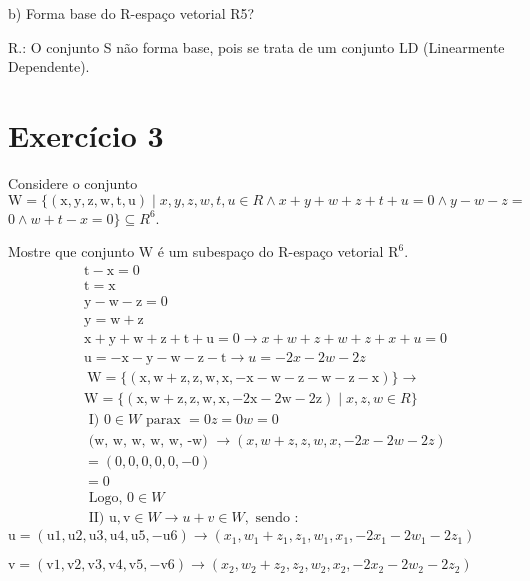 \documentclass[10pt]{article}
\begin{document}
b) Forma base do R-espaço vetorial R5?

R.: O conjunto S não forma base, pois se trata de um conjunto LD (Linearmente Dependente).

\section{Exercício 3}
Considere o conjunto $\mathrm{W}=\{(\mathrm{x}, \mathrm{y}, \mathrm{z}, \mathrm{w}, \mathrm{t}, \mathrm{u}) \mid x, y, z, w, t, u \in R \wedge x+y+w+z+t+u=0 \wedge y-w-z=$ $0 \wedge w+t-x=0\} \subseteq R^{6}$.

Mostre que conjunto $\mathrm{W}$ é um subespaço do R-espaço vetorial $\mathrm{R}^{6}$.
$$
\begin{aligned}
&\mathrm{t}-\mathrm{x}=0 \\
&\mathrm{t}=\mathrm{x} \\
&\mathrm{y}-\mathrm{w}-\mathrm{z}=0 \\
&\mathrm{y}=\mathrm{w}+\mathrm{z} \\
&\mathrm{x}+\mathrm{y}+\mathrm{w}+\mathrm{z}+\mathrm{t}+\mathrm{u}=0 \rightarrow x+w+z+w+z+x+u=0 \\
&\mathrm{u}=-\mathrm{x}-\mathrm{y}-\mathrm{w}-\mathrm{z}-\mathrm{t} \rightarrow u=-2 x-2 w-2 z \\
&\mathrm{~W}=\{(\mathrm{x}, \mathrm{w}+\mathrm{z}, \mathrm{z}, \mathrm{w}, \mathrm{x},-\mathrm{x}-\mathrm{w}-\mathrm{z}-\mathrm{w}-\mathrm{z}-\mathrm{x})\} \rightarrow \\
&\mathrm{W}=\{(\mathrm{x}, \mathrm{w}+\mathrm{z}, \mathrm{z}, \mathrm{w}, \mathrm{x},-2 \mathrm{x}-2 \mathrm{w}-2 \mathrm{z}) \mid x, z, w \in R\} \\
&\text { I) } 0 \in W \text { parax }=0 z=0 w=0 \\
&\text { (w, w, w, w, w, -w) } \rightarrow(x, w+z, z, w, x,-2 x-2 w-2 z) \\
&=(0,0,0,0,0,-0) \\
&=0 \\
&\text { Logo, } 0 \in W \\
&\text { II) } \mathrm{u}, \mathrm{v} \in W \rightarrow u+v \in W, \text { sendo : }
\end{aligned}
$$
$\mathrm{u}=(\mathrm{u} 1, \mathrm{u} 2, \mathrm{u} 3, \mathrm{u} 4, \mathrm{u} 5,-\mathrm{u} 6) \rightarrow\left(x_{1}, w_{1}+z_{1}, z_{1}, w_{1}, x_{1},-2 x_{1}-2 w_{1}-2 z_{1}\right)$

$\mathrm{v}=(\mathrm{v} 1, \mathrm{v} 2, \mathrm{v} 3, \mathrm{v} 4, \mathrm{v} 5,-\mathrm{v} 6) \rightarrow\left(x_{2}, w_{2}+z_{2}, z_{2}, w_{2}, x_{2},-2 x_{2}-2 w_{2}-2 z_{2}\right)$
\end{document}
